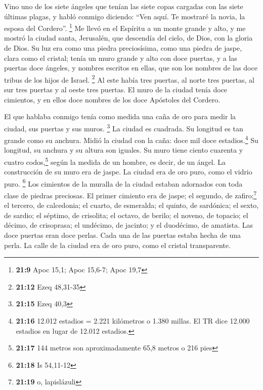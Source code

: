 \begin{paracol}{2}
 Vino uno de los siete ángeles que tenían las siete copas
cargadas con las siete últimas plagas, y habló conmigo diciendo: ``Ven
aquí. Te mostraré la novia, la esposa del Cordero''. \footnote{\textbf{21:9}
  Apoc 15,1; Apoc 15,6-7; Apoc 19,7}  Me llevó en el
Espíritu a un monte grande y alto, y me mostró la ciudad santa,
Jerusalén, que descendía del cielo, de Dios,  con la
gloria de Dios. Su luz era como una piedra preciosísima, como una piedra
de jaspe, clara como el cristal;  tenía un muro grande y
alto con doce puertas, y a las puertas doce ángeles, y nombres escritos
en ellas, que son los nombres de las doce tribus de los hijos de Israel.
\footnote{\textbf{21:12} Ezeq 48,31-35}  Al este había
tres puertas, al norte tres puertas, al sur tres puertas y al oeste tres
puertas.  El muro de la ciudad tenía doce cimientos, y en
ellos doce nombres de los doce Apóstoles del Cordero.

 El que hablaba conmigo tenía como medida una caña de oro
para medir la ciudad, sus puertas y sus muros. \footnote{\textbf{21:15}
  Ezeq 40,3}  La ciudad es cuadrada. Su longitud es tan
grande como su anchura. Midió la ciudad con la caña: doce mil doce
estadios.\footnote{\textbf{21:16} 12.012 estadios = 2.221 kilómetros o
  1.380 millas. El TR dice 12.000 estadios en lugar de 12.012 estadios.}
Su longitud, su anchura y su altura son iguales.  Su muro
tiene ciento cuarenta y cuatro codos,\footnote{\textbf{21:17} 144 metros
  son aproximadamente 65,8 metros o 216 pies} según la medida de un
hombre, es decir, de un ángel.  La construcción de su
muro era de jaspe. La ciudad era de oro puro, como el vidrio puro.
\footnote{\textbf{21:18} Is 54,11-12}  Los cimientos de
la muralla de la ciudad estaban adornados con toda clase de piedras
preciosas. El primer cimiento era de jaspe; el segundo, de
zafiro;\footnote{\textbf{21:19} o, lapislázuli} el tercero, de
calcedonia; el cuarto, de esmeralda;  el quinto, de
sardónica; el sexto, de sardio; el séptimo, de crisolita; el octavo, de
berilo; el noveno, de topacio; el décimo, de crisoprasa; el undécimo, de
jacinto; y el duodécimo, de amatista.  Las doce puertas
eran doce perlas. Cada una de las puertas estaba hecha de una perla. La
calle de la ciudad era de oro puro, como el cristal transparente.


\end{paracol}
